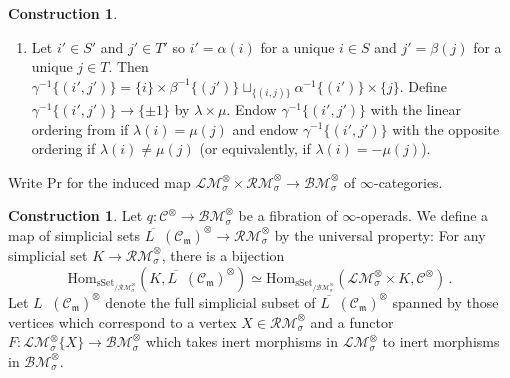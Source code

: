 \documentclass{article}
\DeclareMathOperator{\Modh}{{}^{\sigma}Mod} %
\theoremstyle{definition}
\newtheorem{construction}[theorem]{Construction}
\begin{document}
\begin{construction}
\begin{enumerate}[label=(\arabic*)]
\begin{enumerate}[label=(\roman*)]
        \item Let $ i' \in S' $ and $ j' \in T' $ so $ i' = \alpha(i) $ for a unique $ i \in S $ and $ j' = \beta(j) $ for a unique $ j \in T $. 
        Then $ \gamma^{-1} \{(i',j')\} = \{i\} \times \beta^{-1}\{(j')\} \sqcup_{\{(i,j)\}} \alpha^{-1}\{(i')\} \times \{j\} $. 
        Define $ \gamma^{-1} \{(i',j')\} \to \{\pm 1\} $ by $ \lambda \times \mu $. 
        Endow $ \gamma^{-1} \{(i',j')\} $ with the linear ordering from \cite[Construction 4.3.2.1(2)(iv)]{LurHA} if $ \lambda(i) = \mu(j) $ and endow $ \gamma^{-1} \{(i',j')\} $ with the opposite ordering if $ \lambda(i) \neq \mu(j) $ (or equivalently, if $\lambda(i) = -\mu(j) $). 
    \end{enumerate}
\end{enumerate}
    Write $ \mathrm{Pr} $ for the induced map $ \mathcal{LM}^\otimes_\sigma \times \mathcal{RM}^\otimes_\sigma \to \mathcal{BM}^\otimes_\sigma $ of $ \infty $-categories. 
\end{construction}
\begin{construction}
    Let $ q \colon \mathcal{C}^\otimes \to \mathcal{BM}^\otimes_\sigma $ be a fibration of $ \infty $-operads. 
    We define a map of simplicial sets $ \overline{L\Modh}(\mathcal{C}_{\mathfrak{m}})^\otimes \to \mathcal{RM}^\otimes_\sigma $ by the universal property: For any simplicial set $ K \to \mathcal{RM}^\otimes_\sigma $, there is a bijection
    \begin{equation*}
        \mathrm{Hom}_{\mathrm{sSet}_{/\mathcal{RM}^\otimes_\sigma}}\left(K,\overline{L\Modh}(\mathcal{C}_{\mathfrak{m}})^\otimes \right) \simeq  \mathrm{Hom}_{\mathrm{sSet}_{/\mathcal{BM}^\otimes_\sigma}}\left(\mathcal{LM}^\otimes_\sigma \times K, \mathcal{C}^\otimes \right)\,.
    \end{equation*}
    Let $ L\Modh(\mathcal{C}_{\mathfrak{m}})^\otimes $ denote the full simplicial subset of $ \overline{L\Modh}(\mathcal{C}_{\mathfrak{m}})^\otimes $ spanned by those vertices which correspond to a vertex $ X \in \mathcal{RM}^\otimes_\sigma $ and a functor $ F \colon \mathcal{LM}^\otimes_\sigma \{X\} \to \mathcal{BM}^\otimes_\sigma $ which takes inert morphisms in $ \mathcal{LM}^\otimes_\sigma $ to inert morphisms in $ \mathcal{BM}^\otimes_\sigma $. 
\end{construction}
\end{document}
